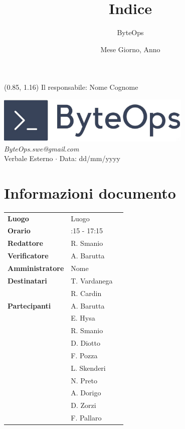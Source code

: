 \documentclass{article}
\title{\textbf{\fontsize{28}{6}\selectfont Indice}}
\author{\fontsize{14}{6}\selectfont ByteOps}
\date{Mese Giorno, Anno}
\begin{document}
\begin{textblock*}{\textwidth}(0.85\textwidth, 1.16\textheight)
    Il responsabile: Nome Cognome
\end{textblock*}

\pagestyle{fancy}
\begin{center}
\includegraphics[width = 0.7\textwidth]{../../../Images/logo.png} \\
\vspace{0.2cm}
\textcolor[RGB]{60, 60, 60}{\textit{ByteOps.swe@gmail.com}} \\
\vspace{1cm}
\fontsize{16}{6}\selectfont Verbale Esterno $\cdot$ Data: dd/mm/yyyy \\
\vspace{0.5cm}
\end{center}

\section*{Informazioni documento}
\def\arraystretch{1.2}
\begin{tabular}{>{\raggedleft\arraybackslash}p{}|>{\raggedright\arraybackslash}p{}c}
\hline
\addlinespace
\textbf{Luogo} & Luogo \vspace{10pt} \\
\textbf{Orario} & 16:15 - 17:15 \vspace{10pt} \\
\textbf{Redattore} & R. Smanio \vspace{10pt} \\
\textbf{Verificatore} & A. Barutta \vspace{10pt} \\
\textbf{Amministratore} & Nome \vspace{10pt} \\
\textbf{Destinatari} & T. Vardanega \\ & R. Cardin \vspace{10pt} \\
\textbf{Partecipanti} & A. Barutta \\ & E. Hysa \\ & R. Smanio \\ & D. Diotto \\ & F. Pozza \\ & L. Skenderi \\ & N. Preto \\ & A. Dorigo \\ & D. Zorzi \\ & F. Pallaro \vspace{10pt} \\
\end{tabular}
\pagebreak 
\end{document}
